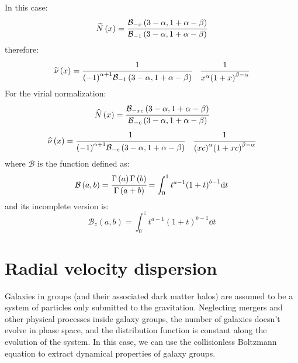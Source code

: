 In this case:
%
\begin{equation}
    \widetilde{N} \left(x\right) = \cfrac{%
        \mathcal{B}_{-x} \left(3-\alpha, 1+\alpha-\beta\right)}
    {\mathcal{B}_{-1} \left(3-\alpha, 1+\alpha-\beta\right)}
\end{equation}
%
therefore:
%
\begin{equation}
    \widetilde\nu \left(x\right) = \cfrac{1}
    {{\left(-1\right)}^{\alpha+1}
        \mathcal{B}_{-1} \left(3-\alpha, 1+\alpha-\beta\right)}
    \quad\cfrac{1}
    {x^\alpha {\left(1+x\right)}^{\beta-\alpha}}
\end{equation}
%
For the virial normalization:
%
\begin{equation}
    \widehat{N} \left(x\right) = \cfrac{%
        \mathcal{B}_{-xc} \left(3-\alpha, 1+\alpha-\beta\right)}
    {\mathcal{B}_{-c} \left(3-\alpha, 1+\alpha-\beta\right)}
\end{equation}
%
\begin{equation}
    \widehat\nu \left(x\right) = \cfrac{1}
    {{\left(-1\right)}^{\alpha+1}
        \mathcal{B}_{-c} \left(3-\alpha, 1+\alpha-\beta\right)}
    \quad\cfrac{1}
    {{\left(xc\right)}^\alpha {\left(1+xc\right)}^{\beta-\alpha}}
\end{equation}
%
where $\mathcal{B}$ is the function defined as:
%
\begin{equation}
    \mathcal{B} \left(a, b\right) =
    \cfrac{\Gamma \left(a\right) \Gamma \left(b\right)}
    {\Gamma \left(a+b\right)} =
    \int_0^1 t^{a-1} {\left(1+t\right)}^{b-1} {\rm{d}} t
\end{equation}
%
and its incomplete version is:
%
\begin{equation}
    \mathcal{B}_z \left(a, b\right) =
    \int_0^z t^{a-1} {\left(1+t\right)}^{b-1} \dd t
\end{equation}

\section{Radial velocity dispersion}
\label{sec:radial_velocity_dispersion}

Galaxies in groups (and their associated dark matter halos) are assumed to be a
system of particles only submitted to the gravitation. Neglecting mergers and
other physical processes inside galaxy groups, the number of galaxies doesn't
evolve in phase space, and the distribution function is constant along the
evolution of the system. In this case, we can use the collisionless Boltzmann
equation to extract dynamical properties of galaxy groups.

